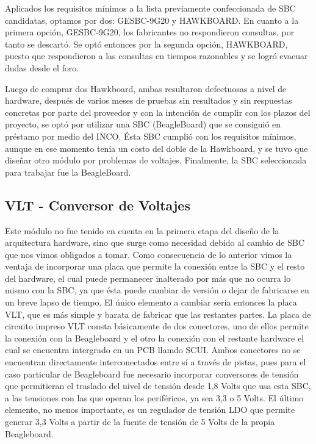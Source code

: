 

Aplicados los requisitos mínimos a la lista previamente confeccionada de SBC candidatas, optamos por dos: GESBC-9G20 y HAWKBOARD.
En cuanto a la primera opción, GESBC-9G20, los fabricantes no respondieron consultas, por tanto se descartó. Se optó entonces por la segunda opción, HAWKBOARD, puesto que respondieron a las consultas en tiempos razonables y se logró evacuar dudas desde el foro.


Luego de comprar dos Hawkboard, ambas resultaron defectuosas a nivel de hardware, después de varios meses de pruebas sin resultados y sin respuestas concretas por parte del proveedor y con la intención de cumplir con los plazos del proyecto, se optó por utilizar una SBC (BeagleBoard) que se consiguió en préstamo por medio del INCO. Ésta SBC cumplió con los requisitos mínimos, aunque en ese momento tenía un costo del doble de la Hawkboard, y se tuvo que diseñar otro módulo por problemas de voltajes.
Finalmente, la SBC seleccionada para trabajar fue la BeagleBoard.


\subsection{VLT - Conversor de Voltajes}
Este módulo no fue tenido en cuenta en la primera etapa del diseño de la arquitectura hardware, sino que surge como necesidad debido al cambio de SBC que nos vimos obligados a tomar. Como consecuencia de lo anterior vimos la ventaja de incorporar una placa que permite la conexión entre la SBC y el resto del hardware, el cual puede permanecer inalterado por más que no ocurra lo mismo con la SBC, ya que ésta puede cambiar de versión o dejar de fabricarse en un breve lapso de tiempo. El único elemento a cambiar sería entonces la placa VLT, que es más simple y barata de fabricar que las restantes partes.
La placa de circuito impreso VLT consta básicamente de dos conectores, uno de ellos permite la conexión con la Beagleboard y el otro la conexión con el restante hardware el cual se encuentra intergrado en un PCB llamdo SCUI. Ambos conectores no se encuentran directamente interconectados entre sí a través de pistas, pues para el caso particular de Beagleboard fue necesario incorporar conversores de tensión que permitieran el traslado del nivel de tensión desde 1,8 Volts que usa esta SBC, a las tensiones con las que operan los periféricos, ya sea 3,3 o 5 Volts.
El último elemento, no menos importante, es un regulador de tensión LDO que permite generar 3,3 Volts a partir de la fuente de tensión de 5 Volts de la propia Beagleboard.

